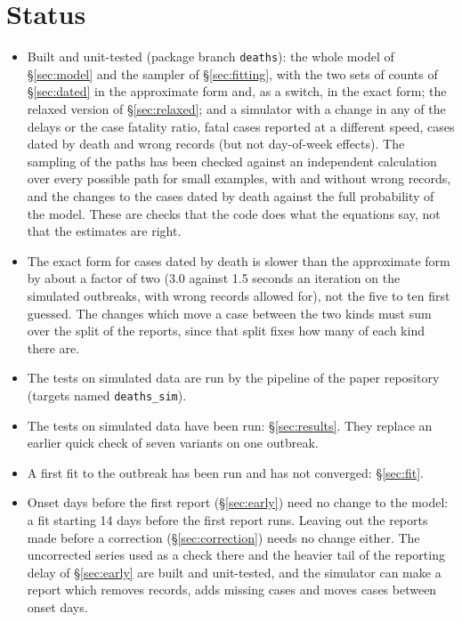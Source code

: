 \documentclass[11pt,a4paper]{article}
\begin{document}
\section{Status}\label{sec:status}

\begin{itemize}
\item Built and unit-tested (package branch \texttt{deaths}): the whole
model of \S\ref{sec:model} and the sampler of \S\ref{sec:fitting}, with the
two sets of counts of \S\ref{sec:dated} in the approximate form and, as a
switch, in the exact form; the relaxed version of \S\ref{sec:relaxed}; and a
simulator with a change in any of the delays or the case fatality ratio,
fatal cases reported at a different speed, cases dated by death and wrong
records (but not day-of-week effects). The sampling of the paths has been
checked against an independent calculation over every possible path for
small examples, with and without wrong records, and the changes to the
cases dated by death against the full probability of the model. These are
checks that the code does what the equations say, not that the estimates
are right.
\item The exact form for cases dated by death is slower than the
approximate form by about a factor of two (3.0 against 1.5 seconds an
iteration on the simulated outbreaks, with wrong records allowed for), not
the five to ten first guessed. The changes which move a case between the
two kinds must sum over the split of the reports, since that split fixes
how many of each kind there are.
\item The tests on simulated data are run by the pipeline of the paper
repository (targets named \texttt{deaths\_sim}).
\item The tests on simulated data have been run: \S\ref{sec:results}. They
replace an earlier quick check of seven variants on one outbreak.
\item A first fit to the outbreak has been run and has not converged:
\S\ref{sec:fit}.
\item Onset days before the first report (\S\ref{sec:early}) need no change
to the model: a fit starting 14 days before the first report runs. Leaving
out the reports made before a correction (\S\ref{sec:correction}) needs no
change either. The uncorrected series used as a check there and the heavier
tail of the reporting delay of \S\ref{sec:early} are built and unit-tested,
and the simulator can
make a report which removes records, adds missing cases and moves cases
between onset days.
\end{itemize}
\end{document}
